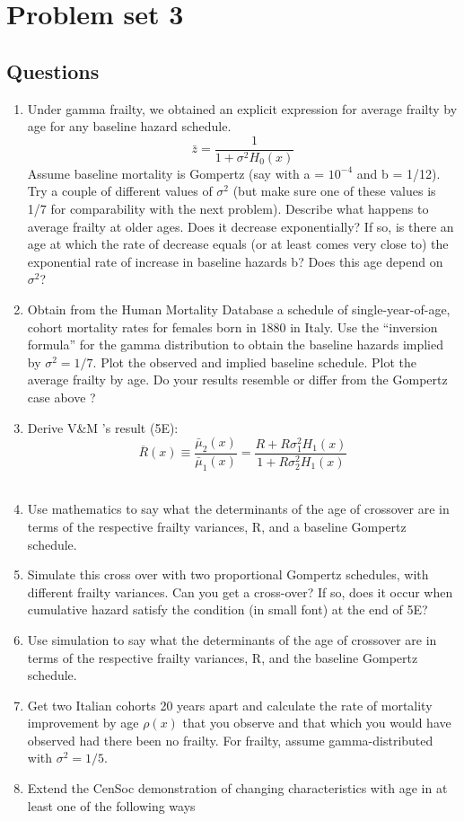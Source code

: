 \documentclass[]{book}
\providecommand{\tightlist}{%
  \setlength{\itemsep}{0pt}\setlength{\parskip}{0pt}}
\begin{document}
\hypertarget{problem-set-3}{%
\chapter{Problem set 3}\label{problem-set-3}}

\hypertarget{questions-2}{%
\section{Questions}\label{questions-2}}

\begin{enumerate}
\def\labelenumi{\arabic{enumi}.}
\tightlist
\item
  Under gamma frailty, we obtained an explicit expression for average frailty by age for any baseline hazard schedule. \[ \bar{z}=\frac{1}{1+\sigma^2 H_0(x)}\] Assume baseline mortality is Gompertz (say with a = \(10^{-4}\) and b = 1/12). Try a couple of different values of \(\sigma^2\) (but make sure one of these values is 1/7 for comparability with the next problem). Describe what happens to average frailty at older ages. Does it decrease exponentially? If so, is there an age at which the rate of decrease equals (or at least comes very close to) the exponential rate of increase in baseline hazards b? Does this age depend on \(\sigma^2\)?\\
\item
  Obtain from the Human Mortality Database a schedule of single-year-of-age, cohort mortality rates for females born in 1880 in Italy. Use the ``inversion formula'' for the gamma distribution to obtain the baseline hazards implied by \(\sigma^2= 1/7\). Plot the observed and implied baseline schedule. Plot the average frailty by age. Do your results resemble or differ from the Gompertz case above ?
\item
  Derive V\&M 's result (5E):\[\overline{R}(x) \equiv \frac{\bar{\mu}_2(x)}{\bar{\mu}_1(x)} = \frac{R + R \sigma_1^2 H_1(x)}{1 + R \sigma_2^2 H_1(x)} \]\\
\item
  Use mathematics to say what the determinants of the age of crossover are in terms of the respective frailty variances, R, and a baseline Gompertz schedule.
\item
  Simulate this cross over with two proportional Gompertz schedules, with different frailty variances. Can you get a cross-over? If so, does it occur when cumulative hazard satisfy the condition (in small font) at the end of 5E?\\
\item
  Use simulation to say what the determinants of the age of crossover are in terms of the respective frailty variances, R, and the baseline Gompertz schedule.\\
\item
  Get two Italian cohorts 20 years apart and calculate the rate of mortality improvement by age \(\rho(x)\) that you observe and that which you would have observed had there been no frailty. For frailty, assume gamma-distributed with \(\sigma^2 = 1/5\).\\
\item
  Extend the CenSoc demonstration of changing characteristics with age in at least one of the following ways


\end{enumerate}
\end{document}
